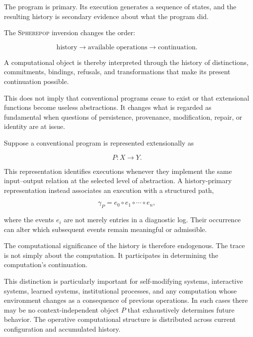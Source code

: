 \documentclass[11pt]{article}
\theoremstyle{remark}
\newcommand{\Spherepop}{\textsc{Spherepop}}
\begin{document}
The program is primary. Its execution generates a sequence of states, and the resulting history is secondary evidence about what the program did.

The \Spherepop{} inversion changes the order:

\begin{equation}
\boxed{
\text{history}
\longrightarrow
\text{available operations}
\longrightarrow
\text{continuation}.
}
\end{equation}

A computational object is thereby interpreted through the history of distinctions, commitments, bindings, refusals, and transformations that make its present continuation possible.

This does not imply that conventional programs cease to exist or that extensional functions become useless abstractions. It changes what is regarded as fundamental when questions of persistence, provenance, modification, repair, or identity are at issue.

Suppose a conventional program is represented extensionally as

\begin{equation}
P:X\rightarrow Y.
\end{equation}

This representation identifies executions whenever they implement the same input--output relation at the selected level of abstraction. A history-primary representation instead associates an execution with a structured path,

\begin{equation}
\gamma_P
=
e_0
\circ e_1
\circ \cdots
\circ e_n,
\end{equation}

where the events $e_i$ are not merely entries in a diagnostic log. Their occurrence can alter which subsequent events remain meaningful or admissible.

The computational significance of the history is therefore endogenous. The trace is not simply about the computation. It participates in determining the computation's continuation.

This distinction is particularly important for self-modifying systems, interactive systems, learned systems, institutional processes, and any computation whose environment changes as a consequence of previous operations. In such cases there may be no context-independent object $P$ that exhaustively determines future behavior. The operative computational structure is distributed across current configuration and accumulated history.
\end{document}
